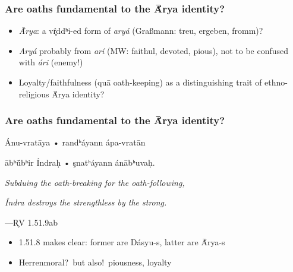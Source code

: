 \documentclass[pdf]{beamer}
\begin{document}
\begin{frame} \frametitle{Are oaths fundamental to the Ā́rya identity?}
\begin{itemize}
	\item \textit{Ā́rya}: a vŕ̥ddʰi-ed form of \textit{aryá} (Graßmann: treu, ergeben, fromm)?
	\pause \item \textit{Aryá} probably from \textit{arí} (MW: faithul, devoted, pious), not to be confused with \textit{ári} (enemy!)
	\pause \item Loyalty/faithfulness (quā oath-keeping) as a distinguishing trait of ethno-religious Ā́rya identity?
\end{itemize}
\end{frame}

\begin{frame} \frametitle{Are oaths fundamental to the Ā́rya identity?}
\begin{center}
	Ánu-vratāya • randʰáyann ápa-vratān

	ābʰū́bʰir Índraḥ • şnatʰáyann ánābʰuvaḥ.

	\vspace{12pt}

	\textit{Subduing the oath-breaking for the oath-following,}

	\textit{Índra destroys the strengthless by the strong.}

	\vspace{12pt}

 	---R̥V 1.51.9ab
\end{center}

\begin{itemize}
	\item 1.51.8 makes clear: former are Dásyu-s, latter are Ā́rya-s
	\item Herrenmoral?~but also!~piousness, loyalty
\end{itemize}
\end{frame}
\end{document}
